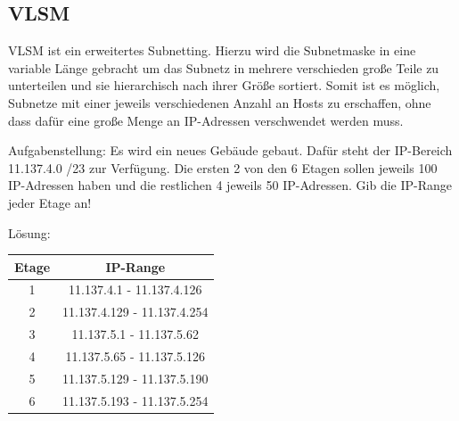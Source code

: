 \documentclass[12pt,a4paper]{article}
\begin{document}
		\subsection{VLSM}
			VLSM ist ein erweitertes Subnetting. Hierzu wird die Subnetmaske in eine variable Länge gebracht um das Subnetz in mehrere verschieden große Teile zu unterteilen und sie hierarchisch nach ihrer Größe sortiert. Somit ist es möglich, Subnetze mit einer jeweils verschiedenen Anzahl an Hosts zu erschaffen, ohne dass dafür eine große Menge an IP-Adressen verschwendet werden muss.\vspace{.3cm}\newline
		\begin{minipage}[t]{.45\textwidth}
			Aufgabenstellung:
			\vspace{.2cm}\newline
			Es wird ein neues Gebäude gebaut. Dafür steht der IP-Bereich 11.137.4.0 /23 zur Verfügung. Die ersten 2 von den 6 Etagen sollen jeweils 100 IP-Adressen haben und die restlichen 4 jeweils 50 IP-Adressen. Gib die IP-Range jeder Etage an!
		\end{minipage}
		\hspace{1cm}
		\begin{minipage}[t]{.45\textwidth}
			Lösung:\vspace{.2cm}\newline
				\renewcommand{\arraystretch}{1.5}
				\begin{tabularx}{7.3cm}{|c|c|}
					\hline
					\cellcolor{cyan!60!white}Etage&\cellcolor{cyan!60!white}IP-Range \\
					\hline
					1&11.137.4.1   -  11.137.4.126 \\
					\hline
					2&11.137.4.129 -  11.137.4.254 \\
					\hline
					3&11.137.5.1   -  11.137.5.62 \\
					\hline
					4&11.137.5.65  -  11.137.5.126 \\
					\hline
					5&11.137.5.129 -  11.137.5.190 \\
					\hline
					6&11.137.5.193 -  11.137.5.254 \\
					\hline
				\end{tabularx}
		\end{minipage}
		
		\newpage
		
\end{document}
